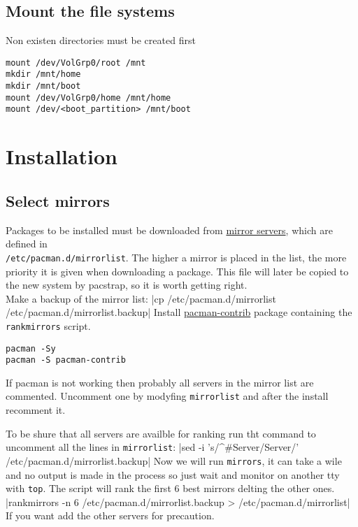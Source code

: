 \documentclass[11pt,A4]{article}
\newcommand{\linecode}[1]{ \mint[fontsize=\small,bgcolor=ArchCode,frame=single]{bash}|#1|}
\begin{document}
\subsection{Mount the file systems}
Non existen directories must be created first
\begin{verbatim}
mount /dev/VolGrp0/root /mnt
mkdir /mnt/home
mkdir /mnt/boot
mount /dev/VolGrp0/home /mnt/home
mount /dev/<boot_partition> /mnt/boot
\end{verbatim}
\section{Installation}
\subsection{Select mirrors}
Packages to be installed must be downloaded from \href{https://wiki.archlinux.org/index.php/Mirrors}{mirror servers}, which are defined in \\ \texttt{/etc/pacman.d/mirrorlist}. The higher a mirror is placed in the list, the more priority it is given when downloading a package. This file will later be copied to the new system by pacstrap, so it is worth getting right.\\
Make a backup of the mirror list:
\linecode{cp /etc/pacman.d/mirrorlist /etc/pacman.d/mirrorlist.backup}
Install \href{https://git.archlinux.org/pacman-contrib.git/about/}{pacman-contrib} package containing the \texttt{rankmirrors} script.
\begin{verbatim}
pacman -Sy
pacman -S pacman-contrib
\end{verbatim}
\begin{tcolorbox}[colback=ArchGreen,sharp corners,boxrule=0.2mm]
If pacman is not working then probably all servers in the mirror list are commented. Uncomment one by modyfing \texttt{mirrorlist} and after the install recomment it.
\end{tcolorbox}
\noindent To be shure that all servers are availble for ranking run tht command to uncomment all the lines in \texttt{mirrorlist}:
|sed -i 's/^#Server/Server/' /etc/pacman.d/mirrorlist.backup|
Now we will run \texttt{mirrors}, it can take a wile and no output is made in the process so just wait and monitor on another tty with \texttt{top}. The script will rank the first 6 best mirrors delting the other ones.
\vspace{-1mm}
\linecode{rankmirrors -n 6 /etc/pacman.d/mirrorlist.backup > /etc/pacman.d/mirrorlist}
If you want add the other servers for precaution.
\end{document}
